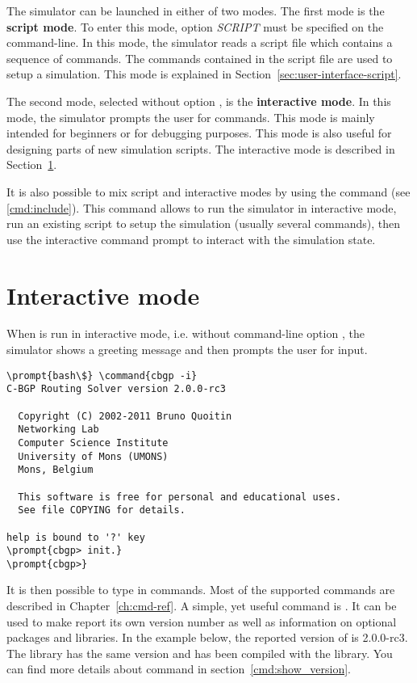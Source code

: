 The simulator can be launched in either of two modes. The first mode
is the {\bf script mode}. To enter this mode, option 
\textit{SCRIPT} must be specified on the command-line. In this mode,
the simulator reads a script file which contains a sequence of
commands. The commands contained in the script file are used to setup
a simulation. This mode is explained in
Section~\ref{sec:user-interface-script}.

The second mode, selected without option , is the
{\bf interactive mode}. In this mode, the simulator prompts the user
for commands. This mode is mainly intended for beginners or for
debugging purposes. This mode is also useful for designing parts of
new simulation scripts. The interactive mode is described in
Section~\ref{sec:user-interface-interactive}.

It is also possible to mix script and interactive modes by using the
 command (see \ref{cmd:include}). This command allows
to run the simulator in interactive mode, run an existing script to
setup the simulation (usually several commands), then use the
interactive command prompt to interact with the simulation state.

\section{Interactive mode}
\label{sec:user-interface-interactive}

When  is run in interactive mode, i.e. without
command-line option , the simulator shows a greeting
message and then prompts the user for input.

\begin{Verbatim}[commandchars=\\\{\}]
\prompt{bash\$} \command{cbgp -i}
C-BGP Routing Solver version 2.0.0-rc3

  Copyright (C) 2002-2011 Bruno Quoitin
  Networking Lab
  Computer Science Institute
  University of Mons (UMONS)
  Mons, Belgium
  
  This software is free for personal and educational uses.
  See file COPYING for details.

help is bound to '?' key
\prompt{cbgp> init.}
\prompt{cbgp>}
\end{Verbatim}

It is then possible to type in  commands. Most of
the supported  commands are described in
Chapter~\ref{ch:cmd-ref}. A simple, yet useful command is
. It can be used to make  report
its own version number as well as information on optional packages and
libraries. In the example below, the reported version of
 is 2.0.0-rc3. The  library has
the same version and  has been compiled with the
 library. You can find more details about
command  in section~\ref{cmd:show_version}.

